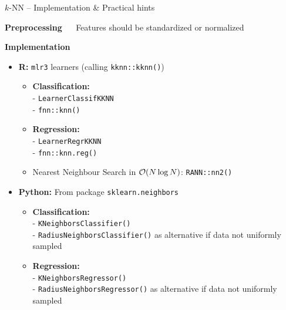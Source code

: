 \documentclass[11pt,compress,t,notes=noshow, xcolor=table]{beamer}
\newcommand{\highlight}[1]{\textcolor{hlcol}{\textbf{#1}}}
\begin{document}
\begin{vbframe}{$k$-NN -- Implementation \& Practical hints}
  \footnotesize

\highlight{Preprocessing} ~~
Features should be standardized or normalized

\medskip

\highlight{Implementation}
\begin{itemize}
  \item \textbf{R:} \texttt{mlr3} learners (calling \texttt{kknn::kknn()})
  \begin{itemize}
    \item \textbf{Classification:}\\ 
    - \texttt{LearnerClassifKKNN}\\
    - \texttt{fnn::knn()}
    \item \textbf{Regression:}\\
    - \texttt{LearnerRegrKKNN}\\
    - \texttt{fnn::knn.reg()}
    \item Nearest Neighbour Search in $\mathcal{O}(N \log N)$: \texttt{RANN::nn2()}
  \end{itemize}
  \item \textbf{Python:} From package \texttt{sklearn.neighbors} 
  \begin{itemize}
    \item \textbf{Classification:}\\ 
    - \texttt{KNeighborsClassifier()}\\
    - \texttt{RadiusNeighborsClassifier()} as alternative if data not uniformly sampled
    \item \textbf{Regression:}\\
    - \texttt{KNeighborsRegressor()} \\
    - \texttt{RadiusNeighborsRegressor()} as alternative if data not uniformly sampled
  \end{itemize}
\end{itemize}
  
\end{vbframe}
\end{document}

